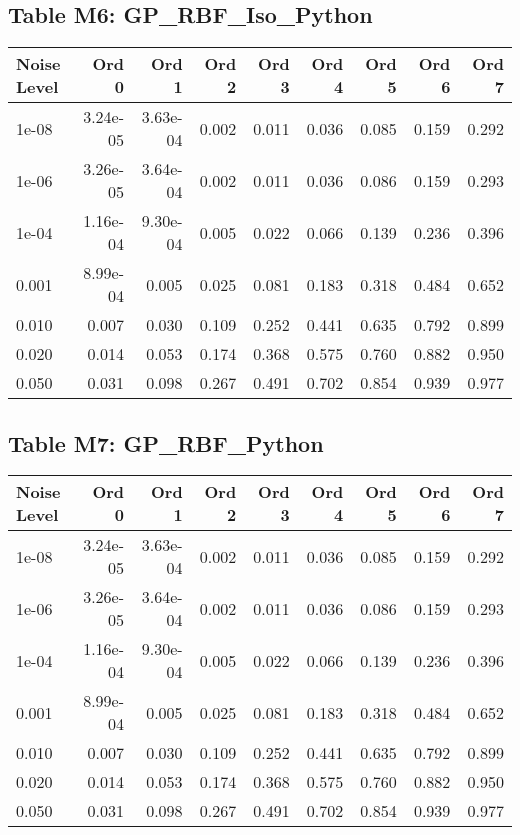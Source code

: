 \clearpage

\subsection*{Table M6: GP\_RBF\_Iso\_Python}

\begin{longtable}{lrrrrrrrr}
\toprule
\textbf{Noise Level} & \textbf{Ord 0} & \textbf{Ord 1} & \textbf{Ord 2} & \textbf{Ord 3} & \textbf{Ord 4} & \textbf{Ord 5} & \textbf{Ord 6} & \textbf{Ord 7} \\
\midrule
\endhead
1e-08 & 3.24e-05 & 3.63e-04 & 0.002 & 0.011 & 0.036 & 0.085 & 0.159 & 0.292 \\
1e-06 & 3.26e-05 & 3.64e-04 & 0.002 & 0.011 & 0.036 & 0.086 & 0.159 & 0.293 \\
1e-04 & 1.16e-04 & 9.30e-04 & 0.005 & 0.022 & 0.066 & 0.139 & 0.236 & 0.396 \\
0.001 & 8.99e-04 & 0.005 & 0.025 & 0.081 & 0.183 & 0.318 & 0.484 & 0.652 \\
0.010 & 0.007 & 0.030 & 0.109 & 0.252 & 0.441 & 0.635 & 0.792 & 0.899 \\
0.020 & 0.014 & 0.053 & 0.174 & 0.368 & 0.575 & 0.760 & 0.882 & 0.950 \\
0.050 & 0.031 & 0.098 & 0.267 & 0.491 & 0.702 & 0.854 & 0.939 & 0.977 \\
\bottomrule
\end{longtable}

\clearpage

\subsection*{Table M7: GP\_RBF\_Python}

\begin{longtable}{lrrrrrrrr}
\toprule
\textbf{Noise Level} & \textbf{Ord 0} & \textbf{Ord 1} & \textbf{Ord 2} & \textbf{Ord 3} & \textbf{Ord 4} & \textbf{Ord 5} & \textbf{Ord 6} & \textbf{Ord 7} \\
\midrule
\endhead
1e-08 & 3.24e-05 & 3.63e-04 & 0.002 & 0.011 & 0.036 & 0.085 & 0.159 & 0.292 \\
1e-06 & 3.26e-05 & 3.64e-04 & 0.002 & 0.011 & 0.036 & 0.086 & 0.159 & 0.293 \\
1e-04 & 1.16e-04 & 9.30e-04 & 0.005 & 0.022 & 0.066 & 0.139 & 0.236 & 0.396 \\
0.001 & 8.99e-04 & 0.005 & 0.025 & 0.081 & 0.183 & 0.318 & 0.484 & 0.652 \\
0.010 & 0.007 & 0.030 & 0.109 & 0.252 & 0.441 & 0.635 & 0.792 & 0.899 \\
0.020 & 0.014 & 0.053 & 0.174 & 0.368 & 0.575 & 0.760 & 0.882 & 0.950 \\
0.050 & 0.031 & 0.098 & 0.267 & 0.491 & 0.702 & 0.854 & 0.939 & 0.977 \\
\bottomrule
\end{longtable}

